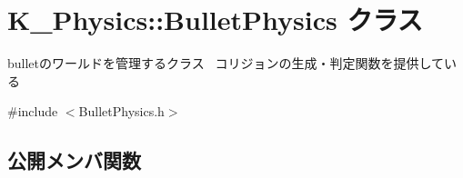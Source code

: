 \hypertarget{class_k___physics_1_1_bullet_physics}{}\section{K\+\_\+\+Physics\+:\+:Bullet\+Physics クラス}
\label{class_k___physics_1_1_bullet_physics}


bulletのワールドを管理するクラス~\newline
コリジョンの生成・判定関数を提供している  




{\ttfamily \#include $<$Bullet\+Physics.\+h$>$}

\subsection*{公開メンバ関数}
